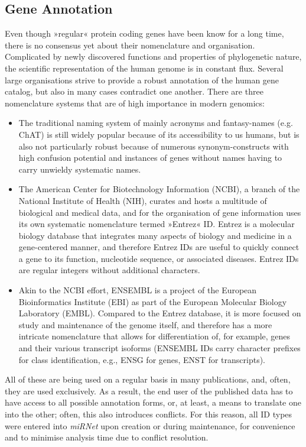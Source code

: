 \subsection{Gene Annotation}
Even though »regular« protein coding genes have been know for a long time, there is no consensus yet about their nomenclature and organisation. Complicated by newly discovered functions and properties of phylogenetic nature, the scientific representation of the human genome is in constant flux. Several large organisations strive to provide a robust annotation of the human gene catalog, but also in many cases contradict one another. There are three nomenclature systems that are of high importance in modern genomics: 
\begin{itemize}
\item The traditional naming system of mainly acronyms and fantasy-names (e.g. ChAT) is still widely popular because of its accessibility to us humans, but is also not particularly robust because of numerous synonym-constructs with high confusion potential and instances of genes without names having to carry unwieldy systematic names.
\item The American Center for Biotechnology Information (NCBI), a branch of the National Institute of Health (NIH), curates and hosts a multitude of biological and medical data, and for the organisation of gene information uses its own systematic nomenclature termed »Entrez« ID. Entrez is a molecular biology database that integrates many aspects of biology and medicine in a gene-centered manner, and therefore Entrez IDs are useful to quickly connect a gene to its function, nucleotide sequence, or associated diseases. Entrez IDs are regular integers without additional characters.
\item Akin to the NCBI effort, ENSEMBL is a project of the European Bioinformatics Institute (EBI) as part of the European Molecular Biology Laboratory (EMBL). Compared to the Entrez database, it is more focused on study and maintenance of the genome itself, and therefore has a more intricate nomenclature that allows for differentiation of, for example, genes and their various transcript isoforms (ENSEMBL IDs carry character prefixes for class identification, e.g., ENSG for genes, ENST for transcripts).
\end{itemize}
All of these are being used on a regular basis in many publications, and, often, they are used exclusively. As a result, the end user of the published data has to have access to all possible annotation forms, or, at least, a means to translate one into the other; often, this also introduces conflicts. For this reason, all ID types were entered into \textit{miRNet} upon creation or during maintenance, for convenience and to minimise analysis time due to conflict resolution.

